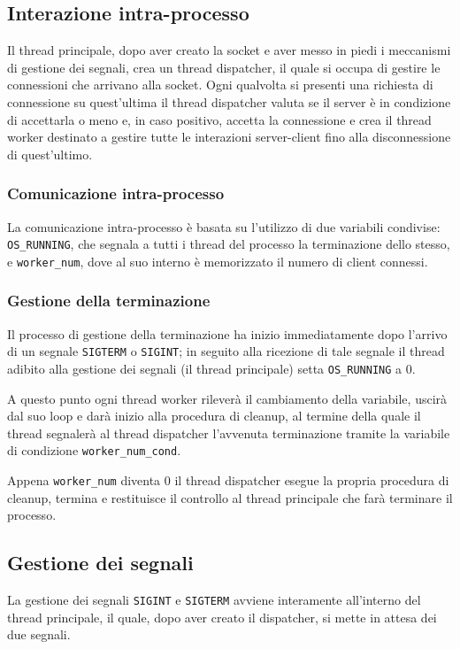 \documentclass[a4paper,11pt]{article}
\begin{document}
\subsection{Interazione intra-processo}
Il thread principale, dopo aver creato la socket e aver messo in piedi i meccanismi di gestione dei segnali, crea un thread dispatcher, il quale
si occupa di gestire le connessioni che arrivano alla socket. Ogni qualvolta si presenti una richiesta di connessione su quest'ultima il thread dispatcher
valuta se il server è in condizione di accettarla o meno e, in caso positivo, accetta la connessione e crea il thread worker destinato a gestire tutte le interazioni server-client fino
alla disconnessione di quest'ultimo.
\subsubsection{Comunicazione intra-processo}
La comunicazione intra-processo è basata su l'utilizzo di due variabili condivise: \texttt{OS\_RUNNING}, che segnala a tutti i thread del processo la terminazione
dello stesso, e \texttt{worker\_num}, dove al suo interno è memorizzato il numero di client connessi.
\subsubsection{Gestione della terminazione}
Il processo di gestione della terminazione ha inizio immediatamente dopo l'arrivo di un segnale \texttt{SIGTERM} o \texttt{SIGINT}; in seguito alla ricezione di tale segnale
il thread adibito alla gestione dei segnali (il thread principale) setta \texttt{OS\_RUNNING} a 0.

A questo punto ogni thread worker rileverà il cambiamento della variabile, uscirà dal suo loop e darà inizio alla procedura di cleanup,
al termine della quale il thread segnalerà al thread dispatcher l'avvenuta terminazione tramite la variabile di condizione \texttt{worker\_num\_cond}.

Appena \texttt{worker\_num} diventa 0 il thread dispatcher esegue la propria procedura di cleanup, termina e restituisce il controllo al thread principale che farà terminare il processo.
\subsection{Gestione dei segnali}
La gestione dei segnali \texttt{SIGINT} e \texttt{SIGTERM} avviene interamente all'interno del thread principale, il quale, dopo aver creato il dispatcher, si mette in attesa dei due segnali.
\end{document}
